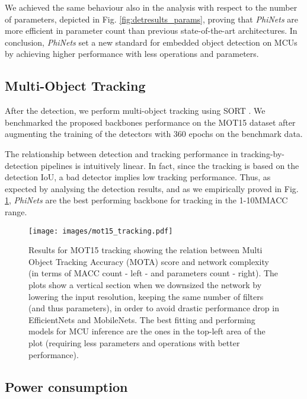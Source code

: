 We achieved the same behaviour also in the analysis with respect to the number of parameters, depicted in Fig. \ref{fig:detresults_params}, proving that \textit{PhiNets} are more efficient in parameter count than previous state-of-the-art architectures. In conclusion, \textit{PhiNets} set a new standard for embedded object detection on MCUs by achieving higher performance with less operations and parameters.

\subsection{Multi-Object Tracking}

After the detection, we perform multi-object tracking using SORT \cite{bewley2016simple}. We benchmarked the proposed backbones performance on the MOT15 dataset \cite{leal2015motchallenge} after augmenting the training of the detectors with 360 epochs on the benchmark data.

The relationship between detection and tracking performance in tracking-by-detection pipelines is intuitively linear. In fact, since the tracking is based on the detection IoU, a bad detector implies low tracking performance. Thus, as expected by analysing the detection results, and as we empirically proved in Fig. \ref{fig:mot_res}, \textit{PhiNets} are the best performing backbone for tracking in the 1-10MMACC range.

\begin{figure}[H]
  \centering
  \texttt{[image: images/mot15\_tracking.pdf]}
  \caption{Results for MOT15 tracking showing the relation between Multi Object Tracking Accuracy (MOTA) score and network complexity (in terms of MACC count - left - and parameters count - right). The plots show a vertical section when we downsized the network by lowering the input resolution, keeping the same number of filters (and thus parameters), in order to avoid drastic performance drop in EfficientNets and MobileNets. The best fitting and performing models for MCU inference are the ones in the top-left area of the plot (requiring less parameters and operations with better performance).}
  \label{fig:mot_res}
\end{figure}

\subsection{Power consumption}

